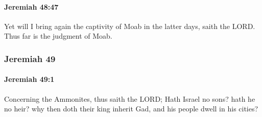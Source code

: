 		\paragraph{Jeremiah 48:47} %
			\label{JEREMIAH-48-47}

			Yet will I bring again the captivity of Moab in the latter days, saith the LORD. Thus far is the judgment of Moab.

	\subsubsection{Jeremiah 49} %
		\label{JEREMIAH-49}

		\paragraph{Jeremiah 49:1} %
			\label{JEREMIAH-49-1}

			Concerning the Ammonites, thus saith the LORD; Hath Israel no sons? hath he no heir? why then doth their king inherit Gad, and his people dwell in his cities?

